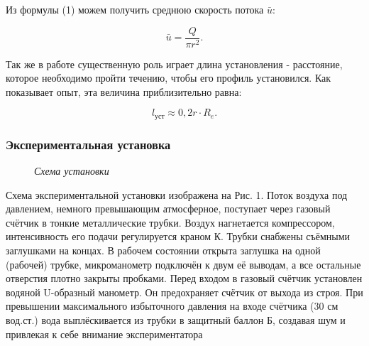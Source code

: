 \documentclass[a4paper, fontsize = 14pt]{article}
\begin{document}
Из формулы (1) можем получить среднюю скорость потока $\bar{u}$:

\begin{equation}
	\bar{u} = \frac{Q}{\pi r^2}.
\end{equation}

Так же в работе существенную роль играет длина установления - расстояние, которое необходимо пройти течению, чтобы его профиль установился. Как показывает опыт, эта величина приблизительно равна:

\begin{equation}
	l_{уст}\approx 0,2r\cdot R_e.
\end{equation}

\subsubsection*{Экспериментальная установка}

\begin{figure}[hbt]\label{risI}
\caption{\textit{Схема установки}}
\end{figure}

Схема экспериментальной установки изображена на Рис. 1. Поток воздуха под давлением, немного превышающим атмосферное, поступает через газовый счётчик в тонкие металлические трубки. Воздух нагнетается
компрессором, интенсивность его подачи регулируется краном К. Трубки снабжены съёмными заглушками на концах. В рабочем состоянии открыта заглушка на одной (рабочей) трубке, микроманометр подключён к двум её выводам, а все остальные отверстия плотно закрыты пробками. Перед входом в газовый счётчик установлен водяной U-образный манометр. Он предохраняет счётчик от выхода из строя. При превышении максимального избыточного давления на входе счётчика (30 см вод.ст.) вода выплёскивается из трубки в защитный баллон Б, создавая шум
и привлекая к себе внимание экспериментатора
\end{document}
